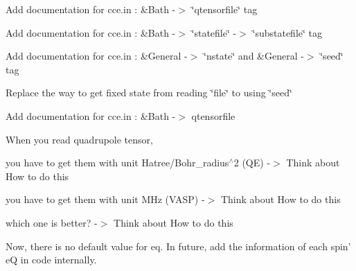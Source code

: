 \begin{DoxyRefList}
Add documentation for cce.\-in \-: \&Bath -\/$>$ \char`\"{}qtensorfile\char`\"{} tag  
\item[\label{todo__todo000005}%
\hypertarget{todo__todo000005}{}%
Member \hyperlink{structBathSpin_a6348f965fe820b03094f4c620ab7ffe0}{Bath\-Spin\-:\-:state} ]Add documentation for cce.\-in \-: \&Bath -\/$>$ \char`\"{}statefile\char`\"{} -\/$>$ \char`\"{}substatefile\char`\"{} tag 

Add documentation for cce.\-in \-: \&General -\/$>$ \char`\"{}nstate\char`\"{} and \&General -\/$>$ \char`\"{}seed\char`\"{} tag 

Replace the way to get fixed state from reading \char`\"{}file\char`\"{} to using \char`\"{}seed\char`\"{}  
\item[\label{todo__todo000003}%
\hypertarget{todo__todo000003}{}%
Member \hyperlink{structBathSpin_ae88f65d01b379916181269efa6c33e8a}{Bath\-Spin\-:\-:xyz} \mbox{[}3\mbox{]}]Add documentation for cce.\-in \-: \&Bath -\/$>$ qtensorfile 

When you read quadrupole tensor,
\begin{DoxyItemize}
\item you have to get them with unit Hatree/\-Bohr\-\_\-radius$^\wedge$2 (Q\-E) -\/$>$ Think about How to do this
\item you have to get them with unit M\-Hz (V\-A\-S\-P) -\/$>$ Think about How to do this
\item which one is better? -\/$>$ Think about How to do this 
\end{DoxyItemize}

Now, there is no default value for eq. In future, add the information of each spin' e\-Q in code internally. 


\end{DoxyRefList}
